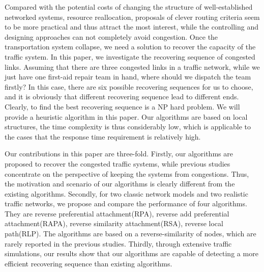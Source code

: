 \documentclass[onecolumn,preprintnumbers,amsmath,amssymb]{revtex4}
\begin{document}
Compared with the potential costs of changing the structure of well-established networked systems, resource reallocation, proposals of clever routing criteria seem to be more practical and thus attract the most interest, while the controlling and designing approaches can not completely avoid congestion. 
Once the transportation system collapse, we need a solution to recover the capacity of the traffic system. 
In this paper, we investigate the recovering sequence of congested links. 
Assuming that there are three congested links in a traffic network, while we just have one first-aid repair team in hand, where should we dispatch the team firstly?
In this case, there are six possible recovering sequences for us to choose, and it is obviously that different recovering sequence lead to different ends.
Clearly, to find the best recovering sequence is a NP hard problem. 
We will provide a heuristic algorithm in this paper.
Our algorithms are based on local  structures, the time complexity is thus considerably low, which is applicable to the cases that the response time requirement is relatively high. 


Our contributions in this paper are three-fold. 
Firstly, our algorithms are proposed to recover the congested traffic systems, while
previous studies concentrate on the perspective of keeping the systems from congestions.
Thus, the motivation and scenario of our algorithms is clearly different from the existing algorithms. 
Secondly, for two classic network models and two realistic traffic networks, we propose and compare the performance of four algorithms.
They are reverse preferential attachment(RPA), reverse add preferential attachment(RAPA), reverse similarity attachment(RSA), reverse local path(RLP).
The algorithms are based on a reverse-similarity of nodes, which are rarely reported in the previous studies. 
Thirdly, through extensive traffic simulations, our results show that our algorithms are capable of detecting a more efficient recovering sequence than existing algorithms. 
\end{document}
